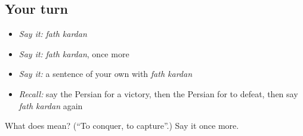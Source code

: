 \subsection*{Your turn}
\begin{itemize}
\raggedright
  \item \emph{Say it:} \emph{fath kardan}
  \item \emph{Say it:} \emph{fath kardan}, once more
  \item \emph{Say it:} a sentence of your own with \emph{fath kardan}
  \item \emph{Recall:} say the Persian for a victory, then the Persian for to defeat, then say \emph{fath kardan} again
\end{itemize}

\begin{tcolorbox}[breakable,colback=teal!4,colframe=teal!35!black,title={Before you move on}]
What does   mean? (\textquotedblleft{}To conquer, to capture\textquotedblright{}.) Say it once more.
\end{tcolorbox}

